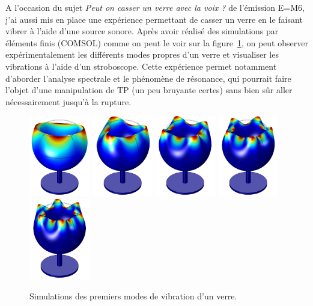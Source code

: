 \documentclass[12pt,a4paper]{article}
\begin{document}
A l'occasion du sujet \textit{Peut on casser un verre avec la voix ?} de l'émission E=M6, j'ai aussi mis en place une expérience permettant de casser un verre en le faisant vibrer à l'aide d'une source sonore.
Après avoir réalisé des simulations par éléments finis (COMSOL) comme on peut le voir sur la figure~\ref{fig:wine_glass}, on peut observer expérimentalement les différents modes propres d'un verre et visualiser les vibrations à l'aide d'un stroboscope.
Cette expérience permet notamment d'aborder l'analyse spectrale et le phénomène de résonance, qui pourrait faire l'objet d'une manipulation de TP (un peu bruyante certes) sans bien sûr aller nécessairement jusqu'à la rupture.

\begin{figure}
\center
\includegraphics[height=100pt]{figures/wine_glass_f0.png}
\includegraphics[height=100pt]{figures/wine_glass_f1.png}
\includegraphics[height=100pt]{figures/wine_glass_f2.png}
\includegraphics[height=100pt]{figures/wine_glass_f3.png}
\includegraphics[height=100pt]{figures/wine_glass_f4.png}
\caption{Simulations des premiers modes de vibration d'un verre.}
\label{fig:wine_glass}
\end{figure}
\end{document}
